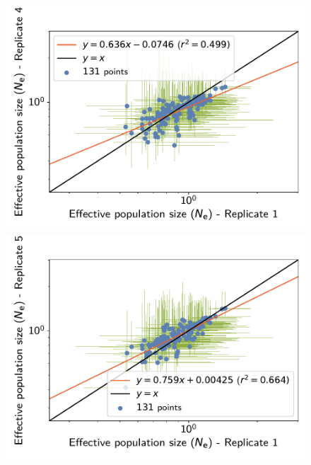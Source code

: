 \documentclass{article}
\begin{document}
\begin{figure}[H]
\begin{minipage}{0.32\linewidth}
			\includegraphics[width=\linewidth, page=1]{isopods/12CDS_SiteMutSelBranchNe_Rep-1-4_LogPopulationSize}
		\end{minipage}
		\begin{minipage}{0.32\linewidth}
			\includegraphics[width=\linewidth, page=1]{isopods/12CDS_SiteMutSelBranchNe_Rep-1-5_LogPopulationSize}
		\end{minipage}
		\begin{minipage}{0.32\linewidth}

\end{minipage}
\end{figure}
\end{document}
